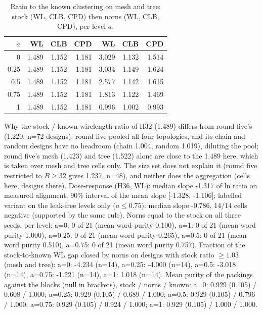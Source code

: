 \begin{table}[t]
\caption{Ratio to the known clustering on mesh and tree: stock (WL, CLB, CPD) then norns (WL, CLB, CPD), per level $a$.}
\label{tab:r6known}
\centering\scriptsize
\begin{tabular}{@{}rrrrrrr@{}}
\toprule
$a$ & WL & CLB & CPD & WL & CLB & CPD \\
\midrule
0 & 1.489 & 1.152 & 1.181 & 3.029 & 1.132 & 1.514 \\
0.25 & 1.489 & 1.152 & 1.181 & 3.034 & 1.149 & 1.624 \\
0.5 & 1.489 & 1.152 & 1.181 & 2.577 & 1.142 & 1.615 \\
0.75 & 1.489 & 1.152 & 1.181 & 1.813 & 1.122 & 1.469 \\
1 & 1.489 & 1.152 & 1.181 & 0.996 & 1.002 & 0.993 \\
\bottomrule
\end{tabular}
\end{table}
Why the stock / known wirelength ratio of H32 (1.489) differs from round five's (1.220, n=72 designs): round five pooled all four topologies, and its chain and random designs have no headroom (chain 1.004, random 1.019), diluting the pool; round five's mesh (1.423) and tree (1.522) alone are close to the 1.489 here, which is taken over mesh and tree cells only. The size set does not explain it (round five restricted to $B\ge32$ gives 1.237, n=48), and neither does the aggregation (cells here, designs there).
Dose-response (H36, WL): median slope -1.317 of ln ratio on measured alignment, 90\% interval of the mean slope [-1.328, -1.106]; labelled variant on the leak-free levels only ($a\le0.75$): median slope -0.786, 14/14 cells negative (supported by the same rule). Norns  equal to the stock  on all three seeds, per level: a=0: 0 of 21 (mean word purity 0.100), a=1: 0 of 21 (mean word purity 1.000), a=0.25: 0 of 21 (mean word purity 0.265), a=0.5: 0 of 21 (mean word purity 0.510), a=0.75: 0 of 21 (mean word purity 0.757). Fraction of the stock-to-known WL gap closed by norns on designs with stock ratio $\ge1.03$ (mesh and tree): a=0: -4.234 (n=14), a=0.25: -4.000 (n=14), a=0.5: -3.018 (n=14), a=0.75: -1.221 (n=14), a=1: 1.018 (n=14). Mean purity of the packings against the blocks (null in brackets), stock / norns / known: a=0: 0.929 (0.105) / 0.608 / 1.000; a=0.25: 0.929 (0.105) / 0.689 / 1.000; a=0.5: 0.929 (0.105) / 0.796 / 1.000; a=0.75: 0.929 (0.105) / 0.924 / 1.000; a=1: 0.929 (0.105) / 1.000 / 1.000. 
